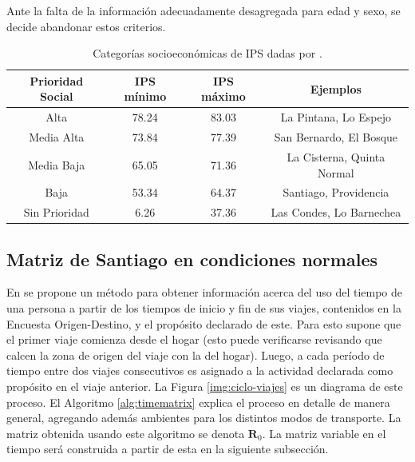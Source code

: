Ante la falta de la información adecuadamente desagregada para edad y sexo, se decide abandonar estos criterios.

\begin{table}[h!]
\centering
\begin{tabular}{|c c c c|} 
 \hline
 \textbf{Prioridad Social} & \textbf{IPS mínimo} & \textbf{IPS máximo} & \textbf{Ejemplos} \\ [0.5ex] 
 \hline
 Alta & 78.24 & 83.03 & La Pintana, Lo Espejo\\ 
 Media Alta & 73.84 & 77.39 & San Bernardo, El Bosque\\
 Media Baja & 65.05 & 71.36 & La Cisterna, Quinta Normal\\
 Baja & 53.34 & 64.37 & Santiago, Providencia\\
 Sin Prioridad & 6.26 & 37.36 & Las Condes, Lo Barnechea\\ [1ex] 
 \hline
\end{tabular}
\caption{Categorías socioeconómicas de IPS dadas por \cite{SEREMIRM2019}.}
\label{table:ips-categ}
\end{table}

\subsection{Matriz de Santiago en condiciones normales} 

En \cite{Munizaga2011} se propone un método para obtener información acerca del uso del tiempo de una persona a partir de los tiempos de inicio y fin de sus viajes, contenidos en la Encuesta Origen-Destino, y el propósito declarado de este. Para esto supone que el primer viaje comienza desde el hogar (esto puede verificarse revisando que calcen la zona de origen del viaje con la del hogar). Luego, a cada período de tiempo entre dos viajes consecutivos es asignado a la actividad declarada como propósito en el viaje anterior. La Figura \ref{img:ciclo-viajes} es un diagrama de este proceso. El Algoritmo \ref{alg:timematrix} explica el proceso en detalle de manera general, agregando además ambientes para los distintos modos de transporte. La matriz obtenida usando este algoritmo se denota \(\mathbf{R}_0\). La matriz variable en el tiempo será construida a partir de esta en la siguiente subsección.


